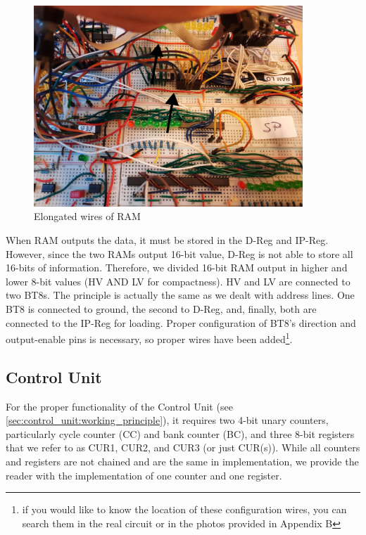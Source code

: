 \begin{figure}[H]
	\centering
	\includegraphics[width=0.9\textwidth]{img/elong_wires_ram}
	\caption{Elongated wires of RAM}
	\label{fig:ram:elongated_wires}
\end{figure}

When RAM outputs the data, it must be stored in the D-Reg and IP-Reg. However, since the two RAMs output 16-bit value, D-Reg is not able to store all 16-bits of information. Therefore, we divided 16-bit RAM output in higher and lower 8-bit values (HV AND LV for compactness). HV and LV are connected to two BT8s. The principle is actually the same as we dealt with address lines. One BT8 is connected to ground, the second to D-Reg, and, finally, both are connected to the IP-Reg for loading. Proper configuration of BT8's direction and output-enable pins is necessary, so proper wires have been added\footnote{if you would like to know the location of these configuration wires, you can search them in the real circuit or in the photos provided in Appendix B}.


\subsection{Control Unit} \label{sec:implementation:control_unit}
For the proper functionality of the Control Unit (see \ref{sec:control_unit:working_principle}), it requires two 4-bit unary counters, particularly cycle counter (CC) and bank counter (BC), and three 8-bit registers that we refer to as CUR1, CUR2, and CUR3 (or just CUR(s)). While all counters and registers are not chained and are the same in implementation, we provide the reader with the implementation of one counter and one register.

